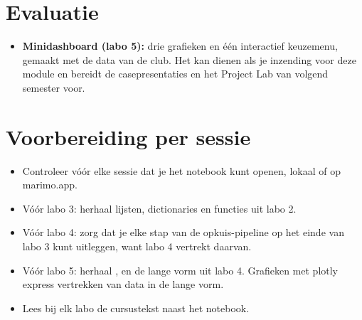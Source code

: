 \documentclass[11pt,a4paper]{article}
\begin{document}
\section{Evaluatie}

\begin{itemize}
  \item \textbf{Minidashboard (labo 5):} drie grafieken en één interactief
        keuzemenu, gemaakt met de data van de club. Het kan dienen als je
        inzending voor deze module en bereidt de casepresentaties en het
        Project Lab van volgend semester voor.
\end{itemize}

\section{Voorbereiding per sessie}

\begin{itemize}
  \item Controleer vóór elke sessie dat je het notebook kunt openen,
        lokaal of op marimo.app.
  \item Vóór labo 3: herhaal lijsten, dictionaries en functies uit
        labo 2.
  \item Vóór labo 4: zorg dat je elke stap van de opkuis-pipeline op het
        einde van labo 3 kunt uitleggen, want labo 4 vertrekt daarvan.
  \item Vóór labo 5: herhaal ,  en de lange
        vorm uit labo 4. Grafieken met plotly express vertrekken van data
        in de lange vorm.
  \item Lees bij elk labo de cursustekst naast het notebook.
\end{itemize}
\end{document}
